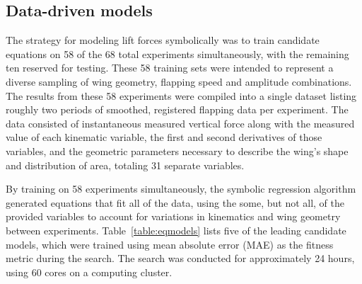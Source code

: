 \documentclass{article}
\begin{document}
\subsection*{Data-driven models}
The strategy for modeling lift forces symbolically was to train candidate equations on 58 of the 68 total experiments simultaneously, with the remaining ten reserved for testing.  These 58 training sets were intended to represent a diverse sampling of wing geometry, flapping speed and amplitude combinations.  The results from these 58 experiments were compiled into a single dataset listing roughly two periods of smoothed, registered flapping data per experiment.  The data consisted of instantaneous measured vertical force along with the measured value of each kinematic variable, the first and second derivatives of those variables, and the geometric parameters necessary to describe the wing's shape and distribution of area, totaling 31 separate variables.

By training on 58 experiments simultaneously, the symbolic regression algorithm generated equations that fit all of the data, using the some, but not all, of the provided variables to account for variations in kinematics and wing geometry between experiments.   Table~\ref{table:eqmodels} lists five of the leading candidate models, which were trained using mean absolute error (MAE) as the fitness metric during the search. The search was conducted for approximately 24 hours, using 60 cores on a computing cluster.
\end{document}

